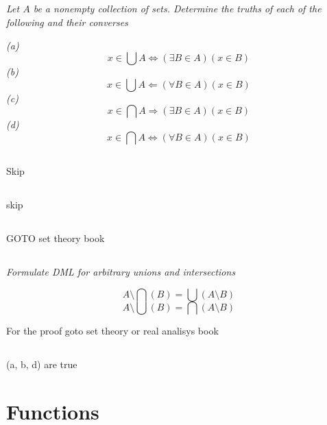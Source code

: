\documentclass[11pt,oneside,titlepage]{book}
\DeclareMathOperator \lra {\Leftrightarrow}
\DeclareMathOperator \la {\Leftarrow}
\DeclareMathOperator \ra {\Rightarrow}
\begin{document}
\subsection{}

\textit{Let $A$ be a nonempty collection of sets. Determine the truths of each of the
  following and their converses}

\textit{(a)
$$x \in \bigcup{A} \lra (\exists B \in A)(x \in B)$$}
\textit{(b)
$$x \in \bigcup{A} \la (\forall B \in A)(x \in B)$$}
\textit{(c)
$$x \in \bigcap{A} \ra (\exists B \in A)(x \in B)$$}
\textit{(d)
$$x \in \bigcap{A} \lra (\forall B \in A)(x \in B)$$}

\subsection{}

Skip

\subsection{}

skip

\subsection{}

GOTO set theory book

\subsection{}

\textit{Formulate DML for arbitrary unions and intersections}

$$A \setminus \bigcap{(B)} = \bigcup{(A \setminus B)} $$
$$A \setminus \bigcup{(B)} = \bigcap{(A \setminus B)} $$

For the proof goto set theory or real analisys book

\subsection{}

(a, b, d) are true

\section{Functions}

\subsection{}
\end{document}
